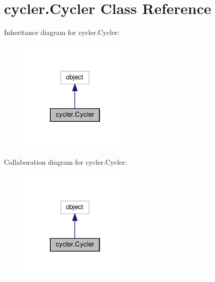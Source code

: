 \hypertarget{classcycler_1_1Cycler}{}\section{cycler.\+Cycler Class Reference}
\label{classcycler_1_1Cycler}


Inheritance diagram for cycler.\+Cycler\+:
\nopagebreak
\begin{figure}[H]
\begin{center}
\leavevmode
\includegraphics[width=154pt]{classcycler_1_1Cycler__inherit__graph}
\end{center}
\end{figure}


Collaboration diagram for cycler.\+Cycler\+:
\nopagebreak
\begin{figure}[H]
\begin{center}
\leavevmode
\includegraphics[width=154pt]{classcycler_1_1Cycler__coll__graph}
\end{center}
\end{figure}
